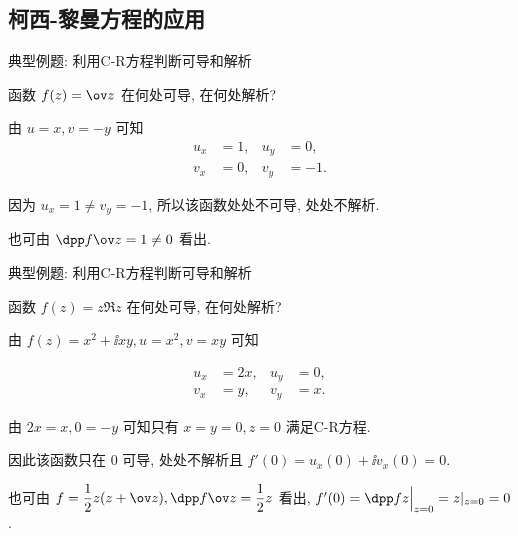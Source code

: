 \subsection{柯西-黎曼方程的应用}
\begin{frame}{典型例题: 利用C-R方程判断可导和解析}
	\onslide<+->
	\begin{example}[nearnext]
		函数 $f(z)=\ov z$ 在何处可导, 在何处解析?
	\end{example}
	\onslide<+->
	\begin{solution}[nearprev]
		\begin{itemize*}
			\item 由 $u=x,v=-y$ 可知
			\begin{align*}
				u_x&=1,&u_y&=0,\\
				v_x&=0,&v_y&=-1.
			\end{align*}
			\item 因为 $u_x=1\neq v_y=-1$, 所以该函数处处不可导, 处处不解析.
			\item 也可由 $\dpp f{\ov z}=1\neq0$ 看出.
		\end{itemize*}
	\end{solution}
\end{frame}


\begin{frame}{典型例题: 利用C-R方程判断可导和解析}
	\onslide<+->
	\begin{example}[near]
		函数 $f(z)=z\Re z$ 在何处可导, 在何处解析?
	\end{example}
	\onslide<+->
	\begin{solution}[near]
		\begin{itemize*}
			\item 由 $f(z)=x^2+\ii xy,u=x^2,v=xy$ 可知
			\item \begin{align*}
				u_x&=2x,&u_y&=0,\\
				v_x&=y, &v_y&=x.
			\end{align*}
			\item 由 $2x=x,0=-y$ 可知只有 $x=y=0,z=0$ 满足C-R方程.
			\item 因此该函数只在 $0$ 可导, 处处不解析且 $f'(0)=u_x(0)+\ii v_x(0)=0$.
			\item 也可由 $f=\dfrac12 z(z+\ov z), \dpp f{\ov z}=\dfrac12 z$ 看出, $f'(0)=\dpp fz\Big|_{z=0}=z|_{z=0}=0$.\smalldel
		\end{itemize*}
	\end{solution}
	\onslide<+->
\end{frame}


